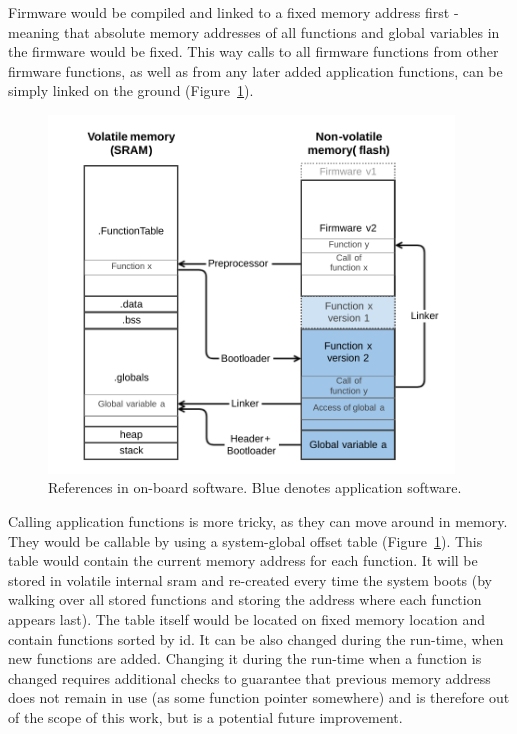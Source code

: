 Firmware would be compiled and linked to a fixed memory address first - meaning that absolute memory addresses of all functions and global variables in the firmware would be fixed. This way calls to all firmware functions from other firmware functions, as well as from any later added application functions, can be simply linked on the ground (Figure~\ref{fig:swLink}).

\begin{figure}[ht]
	\centering
	\includegraphics[width=0.96\textwidth]{figures/Software_linking.pdf}
	\caption{References in on-board software. Blue denotes application software.}
	\label{fig:swLink}
\end{figure}

Calling application functions is more tricky, as they can move around in memory. They would be callable by using a system-global offset table (Figure~\ref{fig:swLink}). This table would contain the current memory address for each function. It will be stored in volatile internal \gls{sram} and re-created every time the system boots (by walking over all stored functions and storing the address where each function appears last). The table itself would be located on fixed memory location and contain functions sorted by id. It can be also changed during the run-time, when new functions are added. Changing it during the run-time when a function is changed requires additional checks to guarantee that previous memory address does not remain in use (as some function pointer somewhere) and is therefore out of the scope of this work, but is a potential future improvement.

